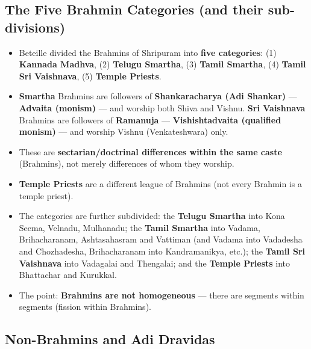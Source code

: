 \subsection{The Five Brahmin Categories (and their sub-divisions)}

\begin{KeyConcept}
\begin{itemize}
\item Beteille divided the Brahmins of Shripuram into \textbf{five categories}: (1) \textbf{Kannada Madhva}, (2) \textbf{Telugu Smartha}, (3) \textbf{Tamil Smartha}, (4) \textbf{Tamil Sri Vaishnava}, (5) \textbf{Temple Priests}.
\item \textbf{Smartha} Brahmins are followers of \textbf{Shankaracharya (Adi Shankar)} --- \textbf{Advaita (monism)} --- and worship both Shiva and Vishnu. \textbf{Sri Vaishnava} Brahmins are followers of \textbf{Ramanuja} --- \textbf{Vishishtadvaita (qualified monism)} --- and worship Vishnu (Venkateshwara) only.
\item These are \textbf{sectarian/doctrinal differences within the same caste} (Brahmins), not merely differences of whom they worship.
\item \textbf{Temple Priests} are a different league of Brahmins (not every Brahmin is a temple priest).
\end{itemize}
\end{KeyConcept}

\begin{KeyConcept}
\begin{itemize}
\item The categories are further subdivided: the \textbf{Telugu Smartha} into Kona Seema, Velnadu, Mulhanadu; the \textbf{Tamil Smartha} into Vadama, Brihacharanam, Ashtasahasram and Vattiman (and Vadama into Vadadesha and Chozhadesha, Brihacharanam into Kandramanikya, etc.); the \textbf{Tamil Sri Vaishnava} into Vadagalai and Thengalai; and the \textbf{Temple Priests} into Bhattachar and Kurukkal.
\item The point: \textbf{Brahmins are not homogeneous} --- there are segments within segments (fission within Brahmins).
\end{itemize}
\end{KeyConcept}

\subsection{Non-Brahmins and Adi Dravidas}


